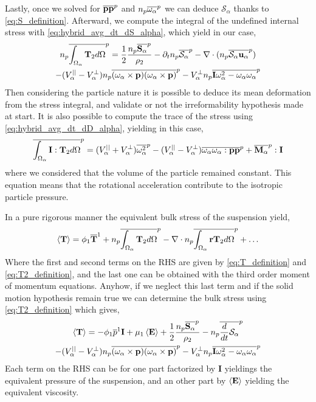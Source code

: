 Lastly, once we solved for $\overline{\textbf{pp}}^{p}$ and $n_p\overline{\omega_\alpha}^{p}$ we can deduce $\mathcal{S}_\alpha$ thanks to \ref{eq:S_definition}.
Afterward, we compute the integral of the undefined internal stress with \ref{eq:hybrid_avg_dt_dS_alpha}, which yield in our case, 
\begin{multline}
    n_p\overline{\int_{\Omega_\alpha} 
        \mathbf{T}_2
    d\Omega}^{p}
    =  
      \frac{1}{2}\frac{n_p\overline{\textbf{S}_\alpha}^{p}}{\rho_2}
    - \partial_t n_p\overline{\mathcal{S}_\alpha}^{p}
    - \mathbf{\nabla}\cdot(n_p\overline{\mathcal{S}_\alpha \textbf{u}_\alpha}^{p})\\
    - (V_\alpha^{||} - V_\alpha^\bot) n_p\overline{
        (\omega_\alpha \times \textbf{p}) (\omega_\alpha \times \textbf{p}) }^{p} 
    -V_\alpha^\bot n_p\overline{\textbf{I} \omega_\alpha^2 -\omega_\alpha\omega_\alpha }^{p}
    \label{eq:T2_definition}
\end{multline}
Then considering the particle nature it is possible to deduce its mean deformation from the stress integral, and validate or not the irreformability hypothesis made at start. 
It is also possible to compute the trace of the stress using \ref{eq:hybrid_avg_dt_dD_alpha}, yielding in this case, 
\begin{equation}
    \overline{\int_{\Omega_\alpha} 
        \textbf{I}:\mathbf{T}_2
    d\Omega}^{p}
    =  
     (V_\alpha^{||} + V_\alpha^\bot) \overline{
    \omega_\alpha^2}^{p} 
    - (V_\alpha^{||} - V_\alpha^\bot) \overline{
    \omega_\alpha\omega_\alpha :  \textbf{pp}}^{p}
    + \overline{\textbf{M}_\alpha}^{p} : \textbf{I}
\end{equation}
where we considered that the volume of the particle remained constant. 
This equation means that the rotational acceleration contribute to the isotropic particle pressure. 


In a pure rigorous manner the equivalent bulk stress of the suspension yield, 
\begin{equation*}
    \left<\textbf{T}\right> = 
    \phi_1 \overline{\textbf{T}}^1 
    + n_p\overline{\int_{\Omega_\alpha} \mathbf{T}_2 d\Omega}^{p}
    -\mathbf{\nabla}\cdot n_p\overline{\int_{\Omega_\alpha} \textbf{r}\mathbf{T}_2 d\Omega}^{p}
    + \ldots
\end{equation*}
Where the first and second terms on the RHS are given by \ref{eq:T_definition} and \ref{eq:T2_definition}, and the last one can be obtained with the third order moment of momentum equations. 
Anyhow, if we neglect this last term and if the solid motion hypothesis remain true we can determine the bulk stress using \ref{eq:T2_definition} which gives,
\begin{multline*}
    \left<\textbf{T}\right> = 
    - \phi_1\overline{p}^1\textbf{I} 
    + \mu_1 \left<\textbf{E}\right> 
    + \frac{1}{2}\frac{n_p\overline{\textbf{S}_\alpha}^{p}}{\rho_2}
    - n_p\overline{\frac{d}{d t} \mathcal{S}_\alpha}^{p}\\
    - (V_\alpha^{||} - V_\alpha^\bot) n_p\overline{
        (\omega_\alpha \times \textbf{p}) (\omega_\alpha \times \textbf{p}) }^{p} 
    -V_\alpha^\bot n_p\overline{\textbf{I} \omega_\alpha^2 -\omega_\alpha\omega_\alpha }^{p}
\end{multline*}
Each term on the RHS can be for one part factorized by \textbf{I} yieldings the equivalent pressure of the suspension, and an other part by $\left<\textbf{E}\right>$ yielding the equivalent viscosity. 


